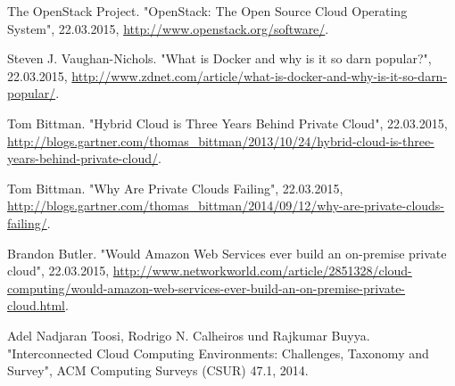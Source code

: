 \begin{thebibliography}{1}
The OpenStack Project. "OpenStack: The Open Source Cloud Operating System", 22.03.2015, \url{http://www.openstack.org/software/}.

Steven J. Vaughan-Nichols. "What is Docker and why is it so darn popular?", 22.03.2015, \url{http://www.zdnet.com/article/what-is-docker-and-why-is-it-so-darn-popular/}.

Tom Bittman. "Hybrid Cloud is Three Years Behind Private Cloud", 22.03.2015, \url{http://blogs.gartner.com/thomas_bittman/2013/10/24/hybrid-cloud-is-three-years-behind-private-cloud/}.

Tom Bittman. "Why Are Private Clouds Failing", 22.03.2015, \url{http://blogs.gartner.com/thomas_bittman/2014/09/12/why-are-private-clouds-failing/}.

Brandon Butler. "Would Amazon Web Services ever build an on-premise private cloud", 22.03.2015, \url{http://www.networkworld.com/article/2851328/cloud-computing/would-amazon-web-services-ever-build-an-on-premise-private-cloud.html}.

Adel Nadjaran Toosi, Rodrigo N. Calheiros und Rajkumar Buyya. "Interconnected Cloud Computing Environments: Challenges, Taxonomy and Survey", ACM Computing Surveys (CSUR) 47.1, 2014.

\end{thebibliography}
